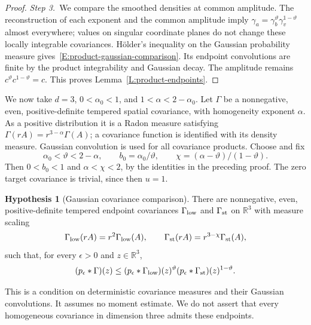 \documentclass[12pt,oneside,openany]{book}
\numberwithin{equation}{section}
\theoremstyle{nogostyle}
\theoremstyle{definition}
\newtheorem{hypothesis}[theorem]{Hypothesis}
\newcommand{\R}{\mathbb{R}}
\begin{document}
\begin{proof}
  \medskip
  \noindent\textit{Step 3.~}We compare the smoothed densities at common
  amplitude.
  The reconstruction of each exponent and the common amplitude imply $\gamma_a =
  \gamma_b^\vartheta\gamma_v^{1-\vartheta}$ almost everywhere; values on
  singular coordinate planes do not change these locally integrable covariances.
  H\"older's inequality on the Gaussian probability measure
  gives~\eqref{E:product-gaussian-comparison}. Its endpoint convolutions are
  finite by the product integrability and Gaussian decay. The amplitude remains
  $c^\vartheta c^{1-\vartheta} = c$. This proves
  Lemma~\ref{L:product-endpoints}.
\end{proof}

We now take $d = 3$, $0 < \alpha_0 < 1$, and $1 < \alpha < 2-\alpha_0$. Let
$\Gamma$ be a nonnegative, even, positive-definite tempered spatial covariance,
with homogeneity exponent $\alpha$. As a positive distribution it is a Radon
measure satisfying $\Gamma(rA) = r^{3-\alpha}\Gamma(A)$; a covariance function
is identified with its density measure. Gaussian convolution is used for all
covariance products. Choose and fix
\begin{equation}\label{E:three-parameters}
  \alpha_0<\vartheta<2-\alpha,\qquad
  b_0=\alpha_0/\vartheta,\qquad
  \chi=(\alpha-\vartheta)/(1-\vartheta).
\end{equation}
Then $0 < b_0 < 1$ and $\alpha < \chi < 2$, by the identities in the preceding
proof. The zero target covariance is trivial, since then $u = 1$.

\begin{hypothesis}[Gaussian covariance comparison]\label{H:three-endpoints}
  There are nonnegative, even, positive-definite tempered endpoint covariances
  $\Gamma_{\rm low}$ and $\Gamma_{\rm st}$ on $\R^3$ with measure scaling
  \[
    \Gamma_{\rm low}(rA)=r^2\Gamma_{\rm low}(A),\qquad
    \Gamma_{\rm st}(rA)=r^{3-\chi}\Gamma_{\rm st}(A),
  \]
  such that, for every $\epsilon > 0$ and $z \in \R^3$,
  \begin{equation}\label{E:three-gaussian-comparison}
    (p_\epsilon*\Gamma)(z)
    \le(p_\epsilon*\Gamma_{\rm low})(z)^\vartheta
    (p_\epsilon*\Gamma_{\rm st})(z)^{1-\vartheta}.
  \end{equation}
\end{hypothesis}

This is a condition on deterministic covariance measures and their Gaussian
convolutions. It assumes no moment estimate. We do not assert that every
homogeneous covariance in dimension three admits these endpoints.
\end{document}
